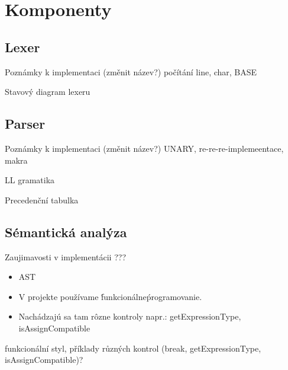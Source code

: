 \documentclass[13pt]{beamer}
\begin{document}
\section{Komponenty}
\subsection{Lexer}

\begin{frame}{Poznámky k implementaci (změnit název?)}
počítání line, char, BASE
\end{frame}

\begin{frame}{Stavový diagram lexeru}
\begin{center}
\end{center}
\end{frame}

\subsection{Parser}

\begin{frame}{Poznámky k implementaci (změnit název?)}
UNARY, re-re-re-implemeentace, makra
\end{frame}

\begin{frame}{LL gramatika}
\end{frame}

\begin{frame}{Precedenční tabulka}
\end{frame}

\subsection{Sémantická analýza}

\begin{frame}{Zaujimavosti v implementácii ???}
  \begin{itemize}
    \item AST
    \item V projekte používame \'funkcionálne\' programovanie.
    \item Nachádzajú sa tam rôzne kontroly napr.: \ttfamily getExpressionType, isAssignCompatible
    \sffamily
  \end{itemize}
funkcionální styl, příklady různých kontrol (break, getExpressionType, isAssignCompatible)?
\end{frame}
\end{document}
